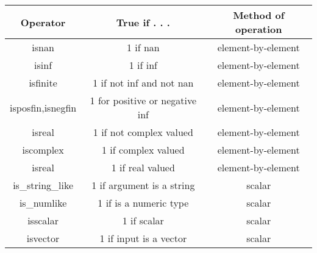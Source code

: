 \documentclass[KSmain.tex]{subfiles}
\begin{document}
\begin{center}
\begin{tabular}{|c|c|c|} \hline
Operator & True if . . . & Method of operation \\ \hline \hline
isnan & 1 if nan & element-by-element \\ \hline
isinf & 1 if inf & element-by-element \\ \hline
isfinite & 1 if not inf and not nan & element-by-element \\ \hline
isposfin,isnegfin & 1 for positive or negative inf & element-by-element \\ \hline
isreal & 1 if not complex valued & element-by-element \\ \hline
iscomplex &1 if complex valued & element-by-element \\ \hline
isreal & 1 if real valued & element-by-element \\ \hline
is\_string\_like & 1 if argument is a string & scalar \\ \hline
is\_numlike& 1 if is a numeric type & scalar \\ \hline
isscalar & 1 if scalar & scalar \\ \hline
isvector & 1 if input is a vector & scalar \\ \hline
\end{tabular}
\end{center}
\end{document}
